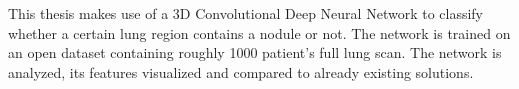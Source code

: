 \documentclass[main.tex]{subfiles}
\begin{document}
This thesis makes use of a 3D Convolutional Deep Neural Network to classify whether a certain lung region contains a nodule or not. The network is trained on an open dataset containing roughly 1000 patient's full lung scan. The network is analyzed, its features visualized and compared to already existing solutions.
\end{document}
